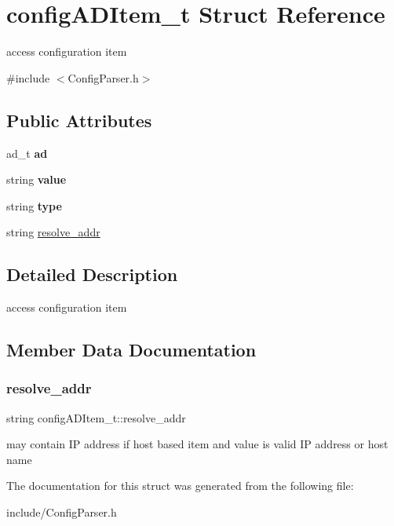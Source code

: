 \hypertarget{structconfigADItem__t}{}\section{config\+A\+D\+Item\+\_\+t Struct Reference}
\label{structconfigADItem__t}


access configuration item  




{\ttfamily \#include $<$Config\+Parser.\+h$>$}

\subsection*{Public Attributes}
\begin{DoxyCompactItemize}
\item 
\mbox{\label{structconfigADItem__t_a104792ad14ceeab63d264721f9f5bdff}} 
ad\+\_\+t {\bfseries ad}
\item 
\mbox{\label{structconfigADItem__t_a3656c6f32c167719777804aca5c1db36}} 
string {\bfseries value}
\item 
\mbox{\label{structconfigADItem__t_a0720d50a27c2b0dc48af7596627177f6}} 
string {\bfseries type}
\item 
string \hyperlink{structconfigADItem__t_a8688b276c6fc46d46e771fc273e301ed}{resolve\+\_\+addr}
\end{DoxyCompactItemize}


\subsection{Detailed Description}
access configuration item 

\subsection{Member Data Documentation}
\mbox{\label{structconfigADItem__t_a8688b276c6fc46d46e771fc273e301ed}} 
\subsubsection{\texorpdfstring{resolve\+\_\+addr}{resolve\_addr}}
{\footnotesize\ttfamily string config\+A\+D\+Item\+\_\+t\+::resolve\+\_\+addr}

may contain IP address if host based item and value is valid IP address or host name 

The documentation for this struct was generated from the following file\+:\begin{DoxyCompactItemize}
\item 
include/Config\+Parser.\+h\end{DoxyCompactItemize}
